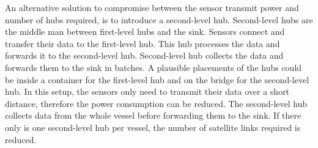 An alternative solution to compromise between the sensor transmit power and number of hubs required, is to introduce a second-level hub. Second-level hubs are the middle man between first-level hubs and the sink. Sensors connect and transfer their data to the first-level hub. This hub processes the data and forwards it to the second-level hub. Second-level hub collects the data and forwards them to the sink in batches. A plausible placements of the hubs could be inside a container for the first-level hub and on the bridge for the second-level hub. In this setup, the sensors only need to transmit their data over a short distance, therefore the power consumption can be reduced. The second-level hub collects data from the whole vessel before forwarding them to the sink. If there only is one second-level hub per vessel, the number of satellite links required is reduced.
%
% 
